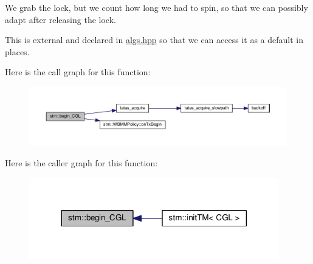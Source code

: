We grab the lock, but we count how long we had to spin, so that we can possibly adapt after releasing the lock.

This is external and declared in \hyperlink{algs_8hpp}{algs.\-hpp} so that we can access it as a default in places. 

Here is the call graph for this function\-:
\nopagebreak
\begin{figure}[H]
\begin{center}
\leavevmode
\includegraphics[width=350pt]{namespacestm_a74784f193abf87bd1c6f688d6b25cacd_cgraph}
\end{center}
\end{figure}




Here is the caller graph for this function\-:
\nopagebreak
\begin{figure}[H]
\begin{center}
\leavevmode
\includegraphics[width=308pt]{namespacestm_a74784f193abf87bd1c6f688d6b25cacd_icgraph}
\end{center}
\end{figure}


